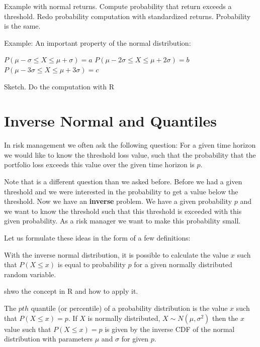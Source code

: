 \documentclass[
]{book}
\providecommand{\tightlist}{%
  \setlength{\itemsep}{0pt}\setlength{\parskip}{0pt}}
\begin{document}
Example with normal returns. Compute probability that return exceeds a threshold. Redo
probability computation with standardized returns. Probability is the same.

Example: An important property of the normal distribution:

\(P(\mu - \sigma \leq X \leq \mu + \sigma) = a\)
\(P(\mu - 2 \sigma \leq X \leq \mu + 2 \sigma) = b\)
\(P(\mu - 3 \sigma \leq X \leq \mu + 3 \sigma) = c\)

Sketch. Do the computation with R

\hypertarget{inverse-normal-and-quantiles}{%
\section{Inverse Normal and Quantiles}\label{inverse-normal-and-quantiles}}

In risk management we often ask the following question: For a given time horizon we would
like to know the threshold loss value, such that the probability that the portfolio loss
exceeds this value over the given time horizon is \(p\).

Note that is a different question than we asked before. Before we had a given threshold and
we were interested in the probability to get a value below the threshold. Now we have an
\textbf{inverse} problem. We have a given probability \(p\) and we want to know the threshold such
that this threshold is exceeded with this given probability. As a risk manager we want to
make this probability small.

Let us formulate these ideas in the form of a few definitions:

\begin{description}
\tightlist
\item[Inverse Normal Distribution]
With the inverse normal distribution, it is possible to calculate the value \(x\) such that
\(P(X \leq x)\) is equal to probability \(p\) for a given normally distributed random variable.
\end{description}

shwo the concept in R and how to apply it.

\begin{description}
\tightlist
\item[Quantile]
The \(pth\) quantile (or percentile) of a probability distribution is the value \(x\) such that
\(P(X \leq x) = p\). If \(X\) is normally distributed, \(X \sim N(\mu, \sigma^2)\) then the
\(x\) value such that \(P(X \leq x) = p\) is given by the inverse CDF of the normal distribution
with parameters \(\mu\) and \(\sigma\) for given \(p\).
\end{description}
\end{document}
